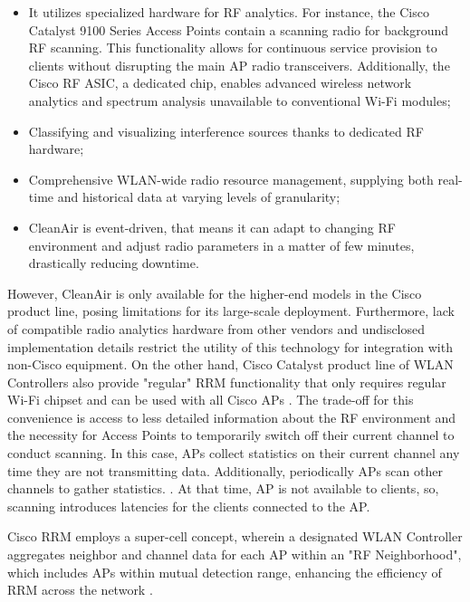 \begin{itemize}
    \item It utilizes specialized hardware for RF analytics. For instance, the Cisco Catalyst 9100 Series Access Points contain a scanning radio for background RF scanning. This functionality allows for continuous service provision to clients without disrupting the main AP radio transceivers. Additionally, the Cisco RF ASIC, a dedicated chip, enables advanced wireless network analytics and spectrum analysis unavailable to conventional Wi-Fi modules;
    \item Classifying and visualizing interference sources thanks to dedicated RF hardware;
    \item Comprehensive WLAN-wide radio resource management, supplying both real-time and historical data at varying levels of granularity;
    \item CleanAir is event-driven, that means it can adapt to changing RF environment and adjust radio parameters in a matter of few minutes, drastically reducing downtime.
\end{itemize}
However, CleanAir is only available for the higher-end models in the Cisco product line, posing limitations for its large-scale deployment. Furthermore, lack of compatible radio analytics hardware from other vendors and undisclosed implementation details restrict the utility of this technology for integration with non-Cisco equipment.
On the other hand, Cisco Catalyst product line of WLAN Controllers also provide "regular" RRM functionality that only requires regular Wi-Fi chipset and can be used with all Cisco APs \cite{ciscoRadioResourceManagement}. The trade-off for this convenience is access to less detailed information about the RF environment and the necessity for Access Points to temporarily switch off their current channel to conduct scanning. In this case, APs collect statistics on their current channel any time they are not transmitting data. Additionally, periodically APs scan other channels to gather statistics. \cite{arenaUnderstandingTroubleshootingCisco2022}. At that time, AP is not available to clients, so, scanning introduces latencies for the clients connected to the AP.

Cisco RRM employs a super-cell concept, wherein a designated WLAN Controller aggregates neighbor and channel data for each AP within an "RF Neighborhood", which includes APs within mutual detection range, enhancing the efficiency of RRM across the network \cite{arenaUnderstandingTroubleshootingCisco2022}.

